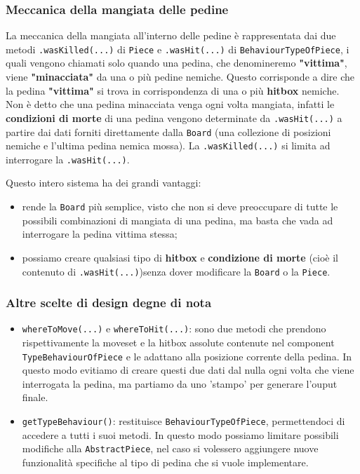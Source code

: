 \documentclass[a4paper,12pt]{report}
\begin{document}
\subsubsection{Meccanica della mangiata delle pedine}

La meccanica della mangiata all'interno delle pedine è rappresentata dai due metodi \texttt{.wasKilled(...)} di \texttt{Piece} e \texttt{.wasHit(...)} di \texttt{BehaviourTypeOfPiece}, i quali vengono chiamati
solo quando una pedina, che denomineremo \textbf{"vittima"}, viene \textbf{"minacciata"} da una o più pedine nemiche. Questo corrisponde a dire che la pedina
\textbf{"vittima"} si trova in corrispondenza di una o più \textbf{hitbox} nemiche. Non è detto che una pedina minacciata venga ogni volta mangiata, infatti le \textbf{condizioni 
di morte} di una pedina vengono determinate da \texttt{.wasHit(...)} a partire dai dati forniti direttamente dalla \texttt{Board} (una collezione di posizioni nemiche e l'ultima pedina nemica mossa).
La \texttt{.wasKilled(...)} si limita ad interrogare la \texttt{.wasHit(...)}.

Questo intero sistema ha dei grandi vantaggi:
\begin{itemize} 
\item rende la \texttt{Board} più semplice, visto che non si deve preoccupare di tutte le possibili combinazioni di mangiata di una pedina, ma basta che vada ad interrogare
la pedina vittima stessa;
\item possiamo creare qualsiasi tipo di \textbf{hitbox} e \textbf{condizione di morte} (cioè il contenuto di \texttt{.wasHit(...)})senza dover modificare la \texttt{Board} o la \texttt{Piece}.
\end{itemize}

\subsubsection{Altre scelte di design degne di nota}
\begin{itemize}
\item \texttt{whereToMove(...)} e \texttt{whereToHit(...)}: sono due metodi che prendono rispettivamente la moveset e la hitbox assolute contenute nel component \texttt{TypeBehaviourOfPiece} e le adattano alla posizione corrente della pedina. In questo modo evitiamo di creare questi due dati dal nulla ogni volta che viene interrogata la pedina, ma partiamo da uno 'stampo' per generare l'ouput finale.
\item \texttt{getTypeBehaviour()}: restituisce \texttt{BehaviourTypeOfPiece}, permettendoci di accedere a tutti i suoi metodi. In questo modo possiamo limitare possibili modifiche alla \texttt{AbstractPiece}, nel caso si volessero aggiungere nuove funzionalità specifiche al tipo di pedina che si vuole implementare.
\end{itemize}
\end{document}
